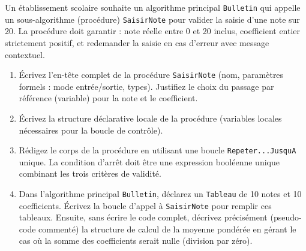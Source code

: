 \documentclass[11pt]{article}
\begin{document}
\begin{exercice}
Un établissement scolaire souhaite un algorithme principal \texttt{Bulletin} qui appelle un sous-algorithme (procédure) \texttt{SaisirNote} pour valider la saisie d'une note sur 20. La procédure doit garantir : note réelle entre 0 et 20 inclus, coefficient entier strictement positif, et redemander la saisie en cas d'erreur avec message contextuel.

\begin{enumerate}
    \item Écrivez l'en-tête complet de la procédure \texttt{SaisirNote} (nom, paramètres formels : mode entrée/sortie, types). Justifiez le choix du passage par référence (variable) pour la note et le coefficient.
    \item Écrivez la structure déclarative locale de la procédure (variables locales nécessaires pour la boucle de contrôle).
    \item Rédigez le corps de la procédure en utilisant une boucle \texttt{Repeter...JusquA} unique. La condition d'arrêt doit être une expression booléenne unique combinant les trois critères de validité.
    \item Dans l'algorithme principal \texttt{Bulletin}, déclarez un \texttt{Tableau} de 10 notes et 10 coefficients. Écrivez la boucle d'appel à \texttt{SaisirNote} pour remplir ces tableaux. Ensuite, sans écrire le code complet, décrivez précisément (pseudo-code commenté) la structure de calcul de la moyenne pondérée en gérant le cas où la somme des coefficients serait nulle (division par zéro).
\end{enumerate}
\end{exercice}
\end{document}

